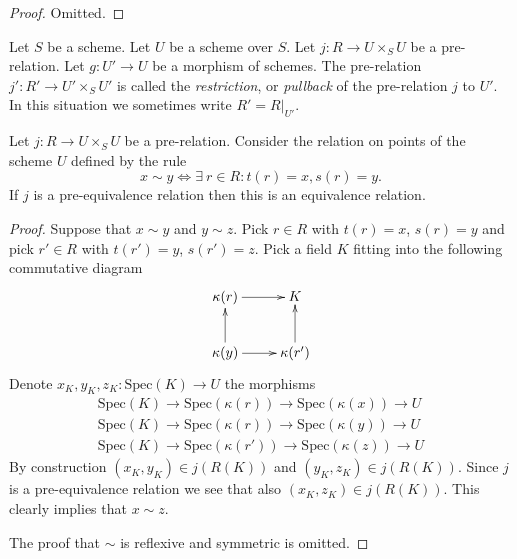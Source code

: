 \begin{proof}
Omitted.
\end{proof}

\begin{definition}
\label{definition-restrict-relation}
Let $S$ be a scheme.
Let $U$ be a scheme over $S$.
Let $j : R \to U \times_S U$ be a pre-relation.
Let $g : U' \to U$ be a morphism of schemes.
The pre-relation $j' : R' \to U' \times_S U'$ is called
the {\it restriction}, or {\it pullback} of the pre-relation $j$ to $U'$.
In this situation we sometimes write $R' = R|_{U'}$.
\end{definition}

\begin{lemma}
\label{lemma-pre-equivalence-equivalence-relation-points}
Let $j : R \to U\times_S U$ be a pre-relation.
Consider the relation on points of the scheme $U$ defined by
the rule
$$
x \sim y
\Leftrightarrow
\exists\ r \in R :
t(r) = x,
s(r) = y.
$$
If $j$ is a pre-equivalence relation then this is an
equivalence relation.
\end{lemma}

\begin{proof}
Suppose that $x \sim y$ and $y \sim z$.
Pick $r \in R$ with $t(r) = x$, $s(r) = y$ and
pick $r' \in R$ with $t(r') = y$, $s(r') = z$.
Pick a field $K$ fitting into the following commutative
diagram
$$
\xymatrix{
\kappa(r) \ar[r] & K \\
\kappa(y) \ar[u] \ar[r] & \kappa(r') \ar[u]
}
$$
Denote $x_K, y_K, z_K : \text{Spec}(K) \to U$
the morphisms
$$
\begin{matrix}
\text{Spec}(K) \to \text{Spec}(\kappa(r))
\to
\text{Spec}(\kappa(x)) \to U \\
\text{Spec}(K) \to \text{Spec}(\kappa(r))
\to
\text{Spec}(\kappa(y)) \to U \\
\text{Spec}(K) \to \text{Spec}(\kappa(r'))
\to
\text{Spec}(\kappa(z)) \to U
\end{matrix}
$$
By construction $(x_K, y_K) \in j(R(K))$ and
$(y_K, z_K) \in j(R(K))$. Since $j$ is a pre-equivalence relation
we see that also $(x_K, z_K) \in j(R(K))$.
This clearly implies that $x \sim z$.

\medskip\noindent
The proof that $\sim$ is reflexive and symmetric is omitted.
\end{proof}















